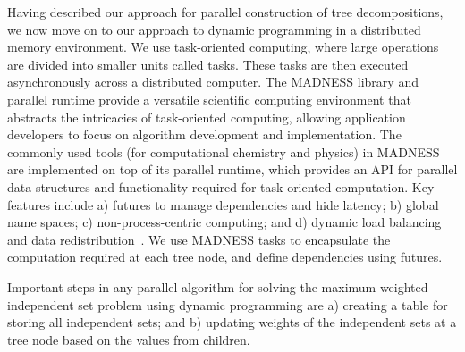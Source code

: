 \documentclass[conference]{IEEEtran}
\begin{document}
Having described our approach
for parallel construction of tree decompositions, we now move on to our approach to dynamic programming in a distributed memory environment. We use task-oriented computing, where large operations are divided into smaller units called tasks. These tasks are then executed asynchronously across a distributed computer. 
The MADNESS library and parallel runtime provide a versatile scientific computing environment that abstracts the intricacies of task-oriented computing, allowing application developers to focus on algorithm development and implementation.
The commonly used tools (for computational chemistry and physics) in MADNESS are implemented on top of its parallel runtime, which provides an API for parallel data structures and functionality required for task-oriented computation. Key features include a) futures to manage dependencies and hide
latency; b) global name spaces; c) non-process-centric
computing; and d) dynamic load balancing and data redistribution~\cite{Thorntonintroducing}.
We use MADNESS tasks to encapsulate the computation required at each
tree node, and define dependencies using futures.



Important steps in any parallel algorithm for solving the maximum weighted independent set problem
using dynamic programming are a) creating a table for storing all independent sets; and
b) updating weights of the independent sets at a tree node based on the values from children.
\end{document}
